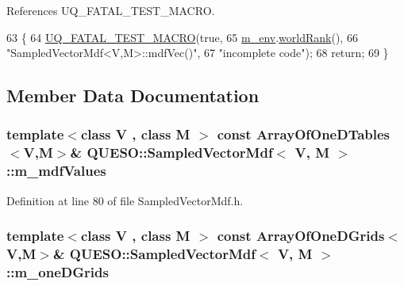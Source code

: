 References U\-Q\-\_\-\-F\-A\-T\-A\-L\-\_\-\-T\-E\-S\-T\-\_\-\-M\-A\-C\-R\-O.


\begin{DoxyCode}
63 \{
64   \hyperlink{_defines_8h_a56d63d18d0a6d45757de47fcc06f574d}{UQ\_FATAL\_TEST\_MACRO}(\textcolor{keyword}{true},
65                       \hyperlink{class_q_u_e_s_o_1_1_base_vector_mdf_a39fbb4c9b12a0906a6d8c82535c837c7}{m\_env}.\hyperlink{class_q_u_e_s_o_1_1_base_environment_a78b57112bbd0e6dd0e8afec00b40ffa7}{worldRank}(),
66                       \textcolor{stringliteral}{"SampledVectorMdf<V,M>::mdfVec()"},
67                       \textcolor{stringliteral}{"incomplete code"});
68   \textcolor{keywordflow}{return};
69 \}
\end{DoxyCode}


\subsection{Member Data Documentation}
\hypertarget{class_q_u_e_s_o_1_1_sampled_vector_mdf_acc6447be666d94453ca26e8b0b8aa9ad}{
\subsubsection[{m\-\_\-mdf\-Values}]{\setlength{\rightskip}{0pt plus 5cm}template$<$class V , class M $>$ const {\bf Array\-Of\-One\-D\-Tables}$<$V,M$>$\& {\bf Q\-U\-E\-S\-O\-::\-Sampled\-Vector\-Mdf}$<$ V, M $>$\-::m\-\_\-mdf\-Values\hspace{0.3cm}{\ttfamily [protected]}}}\label{class_q_u_e_s_o_1_1_sampled_vector_mdf_acc6447be666d94453ca26e8b0b8aa9ad}


Definition at line 80 of file Sampled\-Vector\-Mdf.\-h.

\hypertarget{class_q_u_e_s_o_1_1_sampled_vector_mdf_ace43cdea4553e95bec0fa1490962dd69}{
\subsubsection[{m\-\_\-one\-D\-Grids}]{\setlength{\rightskip}{0pt plus 5cm}template$<$class V , class M $>$ const {\bf Array\-Of\-One\-D\-Grids}$<$V,M$>$\& {\bf Q\-U\-E\-S\-O\-::\-Sampled\-Vector\-Mdf}$<$ V, M $>$\-::m\-\_\-one\-D\-Grids\hspace{0.3cm}{\ttfamily [protected]}}}\label{class_q_u_e_s_o_1_1_sampled_vector_mdf_ace43cdea4553e95bec0fa1490962dd69}


